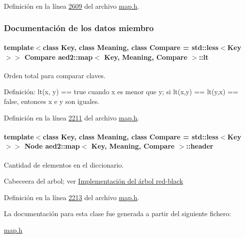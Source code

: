 \-Definición en la línea \hyperlink{map_8h_source_l02609}{2609} del archivo \hyperlink{map_8h_source}{map.\-h}.



\subsubsection{\-Documentación de los datos miembro}
\hypertarget{classaed2_1_1map_a0e5be36fae0693e4665bd2a615e7550a_a0e5be36fae0693e4665bd2a615e7550a}{
\paragraph[{lt}]{\setlength{\rightskip}{0pt plus 5cm}template$<$class \-Key, class \-Meaning, class \-Compare = std\-::less$<$\-Key$>$$>$ \-Compare {\bf aed2\-::map}$<$ \-Key, \-Meaning, \-Compare $>$\-::{\bf lt}}}\label{classaed2_1_1map_a0e5be36fae0693e4665bd2a615e7550a_a0e5be36fae0693e4665bd2a615e7550a}


\-Orden total para comparar claves. 

\-Definición\-: lt(x, y) == true cuando x es menor que y; si lt(x,y) == lt(y,x) == false, entonces x e y son iguales. 

\-Definición en la línea \hyperlink{map_8h_source_l02211}{2211} del archivo \hyperlink{map_8h_source}{map.\-h}.

\hypertarget{classaed2_1_1map_a92d93f905c8ad73fba18fdc7e8915cce_a92d93f905c8ad73fba18fdc7e8915cce}{
\paragraph[{header}]{\setlength{\rightskip}{0pt plus 5cm}template$<$class \-Key, class \-Meaning, class \-Compare = std\-::less$<$\-Key$>$$>$ {\bf \-Node} {\bf aed2\-::map}$<$ \-Key, \-Meaning, \-Compare $>$\-::{\bf header}}}\label{classaed2_1_1map_a92d93f905c8ad73fba18fdc7e8915cce_a92d93f905c8ad73fba18fdc7e8915cce}


\-Cantidad de elementos en el diccionario. 

\-Cabeceera del arbol; ver \hyperlink{Implementacion}{\-Implementación del árbol red-\/black} 

\-Definición en la línea \hyperlink{map_8h_source_l02213}{2213} del archivo \hyperlink{map_8h_source}{map.\-h}.



\-La documentación para esta clase fue generada a partir del siguiente fichero\-:\begin{DoxyCompactItemize}
\item 
\hyperlink{map_8h}{map.\-h}\end{DoxyCompactItemize}
